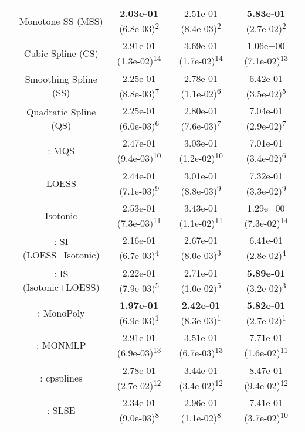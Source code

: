 \begin{tabular}{ccccc}
&Monotone SS (MSS)& \textbf{2.03e-01} (6.8e-03)\textsuperscript{2}& 2.51e-01 (8.4e-03)\textsuperscript{2}& \textbf{5.83e-01} (2.7e-02)\textsuperscript{2}\tabularnewline
&Cubic Spline (CS)& 2.91e-01 (1.3e-02)\textsuperscript{14}& 3.69e-01 (1.7e-02)\textsuperscript{14}& 1.06e+00 (7.1e-02)\textsuperscript{13}\tabularnewline
&Smoothing Spline (SS)& 2.25e-01 (8.8e-03)\textsuperscript{7}& 2.78e-01 (1.1e-02)\textsuperscript{6}& 6.42e-01 (3.5e-02)\textsuperscript{5}\tabularnewline
&Quadratic Spline (QS)& 2.25e-01 (6.0e-03)\textsuperscript{6}& 2.80e-01 (7.6e-03)\textsuperscript{7}& 7.04e-01 (2.9e-02)\textsuperscript{7}\tabularnewline
&\textcite{heMonotoneBsplineSmoothing1998}: MQS& 2.47e-01 (9.4e-03)\textsuperscript{10}& 3.03e-01 (1.2e-02)\textsuperscript{10}& 7.01e-01 (3.4e-02)\textsuperscript{6}\tabularnewline
&LOESS& 2.44e-01 (7.1e-03)\textsuperscript{9}& 3.01e-01 (8.8e-03)\textsuperscript{9}& 7.32e-01 (3.3e-02)\textsuperscript{9}\tabularnewline
&Isotonic& 2.53e-01 (7.3e-03)\textsuperscript{11}& 3.43e-01 (1.1e-02)\textsuperscript{11}& 1.29e+00 (7.3e-02)\textsuperscript{14}\tabularnewline
&\textcite{mammenEstimatingSmoothMonotone1991}: SI (LOESS+Isotonic)& 2.16e-01 (6.7e-03)\textsuperscript{4}& 2.67e-01 (8.0e-03)\textsuperscript{3}& 6.41e-01 (2.8e-02)\textsuperscript{4}\tabularnewline
&\textcite{mammenEstimatingSmoothMonotone1991}: IS (Isotonic+LOESS)& 2.22e-01 (7.9e-03)\textsuperscript{5}& 2.71e-01 (1.0e-02)\textsuperscript{5}& \textbf{5.89e-01} (3.2e-02)\textsuperscript{3}\tabularnewline
&\textcite{murrayFastFlexibleMethods2016}: MonoPoly& \textbf{1.97e-01} (6.9e-03)\textsuperscript{1}& \textbf{2.42e-01} (8.3e-03)\textsuperscript{1}& \textbf{5.82e-01} (2.7e-02)\textsuperscript{1}\tabularnewline
&\textcite{cannonMonmlpMultilayerPerceptron2017}: MONMLP& 2.91e-01 (6.9e-03)\textsuperscript{13}& 3.51e-01 (6.7e-03)\textsuperscript{13}& 7.71e-01 (1.6e-02)\textsuperscript{11}\tabularnewline
&\textcite{navarro-garciaConstrainedSmoothingOutofrange2023}: cpsplines& 2.78e-01 (2.7e-02)\textsuperscript{12}& 3.44e-01 (3.4e-02)\textsuperscript{12}& 8.47e-01 (9.4e-02)\textsuperscript{12}\tabularnewline
&\textcite{groeneboomConfidenceIntervalsMonotone2023}: SLSE& 2.34e-01 (9.0e-03)\textsuperscript{8}& 2.96e-01 (1.1e-02)\textsuperscript{8}& 7.41e-01 (3.7e-02)\textsuperscript{10}\tabularnewline
\bottomrule
\end{tabular}

